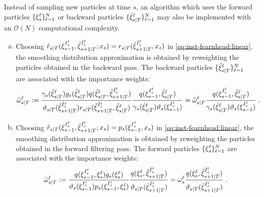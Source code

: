Instead of sampling new particles at time $s$,  an algorithm which uses  the forward particles $\{\xi_{s}^{\ell}\}_{\ell=1}^N$ or backward particles $\{{\check{\xi}}_{s|T}^{\ell}\}_{\ell=1}^N$ may also be implemented with an $\mathcal{O}(N)$ computational complexity. 
\begin{enumerate}[(a)]
\item Choosing $\kiss[smooth]{s}{T}(\epart{s-1}{I_{s}^\ell},\ebackpart{s+1}{T}{\check{I}_{s}^\ell}; x_s) = \kiss{s}{T}(\ebackpart{s+1}{T}{\check{I}_{s}^\ell}, x_s)$ in \eqref{eq:inst-fearnhead:linear}, 
the smoothing distribution approximation is obtained by reweighting the particles obtained in the backward pass. The backward particles $\{{\check{\xi}}_{s|T}^{\ell}\}_{\ell=1}^N$ are associated with the importance weights:
\begin{equation}
\smwght{s}{T}{\ell} \eqdef \frac{ \gamma_s(\ebackpart{s}{T}{\ell})g_s(\ebackpart{s}{T}{\ell}) q(\ebackpart{s}{T}{\ell},\ebackpart{s+1}{T}{\check{I}_{s}^\ell})}{\adjfunc{s}{T}{\ebackpart{s+1}{T}{\check{I}_{s}^\ell}}
\kiss{s}{T}(\ebackpart{s+1}{T}{\check{I}_{s}^\ell}, \ebackpart{s}{T}{\ell})} \frac{q(\epart{s-1}{I_{s}^\ell},\ebackpart{s}{T}{\ell})}{\gamma_s(\ebackpart{s}{T}{\ell})\adjfuncforward{s}(\epart{s-1}{I_{s}^\ell})}= \ebackwght{s}{T}{\ell}\frac{q(\epart{s-1}{I_{s}^\ell},\ebackpart{s}{T}{\ell})}{\gamma_s(\ebackpart{s}{T}{\ell})\adjfuncforward{s}(\epart{s-1}{I_{s}^\ell})}\eqsp.\label{eq:weight-bdm:linear:bkd}
\end{equation}
\item Choosing $\kiss[smooth]{s}{T}(\epart{s-1}{I_{s}^\ell},\ebackpart{s+1}{T}{\check{I}_{s}^\ell}; x_s) = \kissforward{s}{s}(\epart{s-1}{I_{s}^\ell}, x_s)$ in \eqref{eq:inst-fearnhead:linear}, the smoothing distribution approximation is obtained by reweighting the particles obtained in the forward filtering pass. The forward particles $\{\xi_{s}^{\ell}\}_{\ell=1}^N$ are associated with the importance weights:
\begin{equation}
\label{eq:weight-bdm:linear:fwd}
\smwght{s}{T}{\ell} \eqdef \frac{q(\epart{s-1}{I_{s}^\ell},\epart{s}{\ell}) g_s(\epart{s}{\ell}) }{\adjfuncforward{s}(\epart{s-1}{I_{s}^\ell})
\kissforward{s}{s}(\epart{s-1}{I_{s}^\ell}, \epart{s}{\ell}) } \frac{q(\epart{s}{\ell},\ebackpart{s+1}{T}{\check{I}_{s}^\ell})}{\adjfunc{s}{T}{\ebackpart{s+1}{T}{\check{I}_{s}^\ell}}} =  \ewght{s}{\ell}\frac{q(\epart{s}{\ell},\ebackpart{s+1}{T}{\check{I}_{s}^\ell})}{\adjfunc{s}{T}{\ebackpart{s+1}{T}{\check{I}_{s}^\ell}}}\eqsp.
\end{equation}
\end{enumerate}

